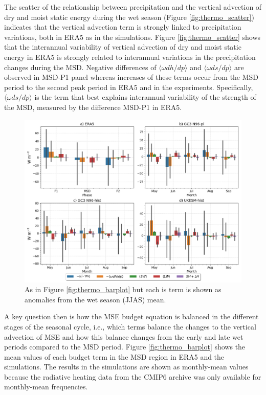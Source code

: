 The scatter of the relationship between precipitation and the vertical advection of dry and moist static energy during the wet season (Figure \ref{fig:thermo_scatter}) indicates that the vertical advection term is strongly linked to precipitation variations, both in ERA5 as in the simulations.
Figure \ref{fig:thermo_scatter} shows that the interannual variability of vertical advection of dry and moist static energy in ERA5 is strongly related to interannual variations in the precipitation changes during the MSD. Negative differences of $\langle \omega dh/dp \rangle$ and $\langle \omega ds/dp \rangle$ are observed in MSD-P1 panel whereas increases of these terms occur from the MSD period to the second peak period in ERA5 and in the experiments. Specifically, $\langle \omega ds/dp \rangle$ is the term that best explains interannual variability of the strength of the MSD, measured by the difference MSD-P1 in ERA5. 

\begin{figure}[t!]
\includegraphics[width=\linewidth]{figures/mse_barplot_norm}
\caption[Barplots of normalized MSE budget terms]{As in Figure \ref{fig:thermo_barplot} but each is term is shown as anomalies from the wet season (JJAS) mean.}
\label{fig:thermo_barplotnm}
\end{figure}

A key question then is how the MSE budget equation is balanced in the different stages of the seasonal cycle, i.e., which terms balance the changes to the vertical advection of MSE and how this balance changes from the early and late wet periods compared to the MSD period. 
Figure \ref{fig:thermo_barplot} shows the mean values of each budget term in the MSD region in ERA5 and the simulations. The results in the simulations are shown as monthly-mean values because the radiative heating data from the CMIP6 archive was only available for monthly-mean frequencies.

